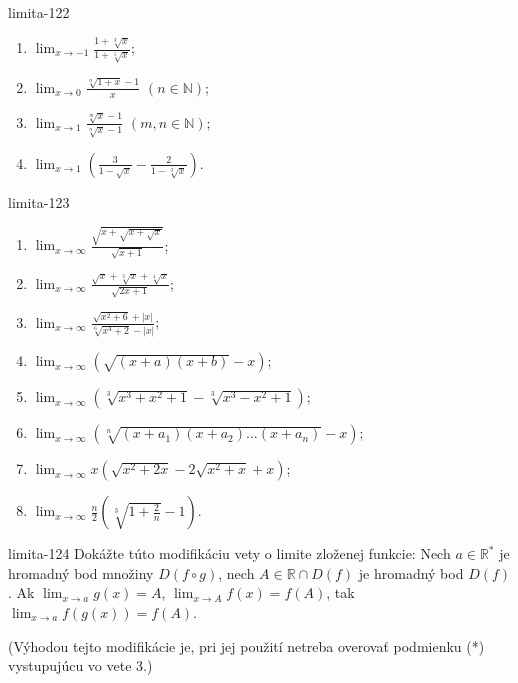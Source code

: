 \begin{defproblem}{limita-122}
\begin{enumerate}
\item $\lim_{x \rightarrow -1} \frac{1+\sqrt[3]{x}}{1+\sqrt[5]{x}}$;
\item $\lim_{x \rightarrow 0} \frac{\sqrt[n]{1+x}-1}{x}$  $(n \in \mathbb{N})$;
\item $\lim_{x \rightarrow 1} \frac{\sqrt[m]{x}-1}{\sqrt[n]{x}-1}$  $(m,n \in \mathbb{N})$;
\item $\lim_{x \rightarrow 1} (\frac{3}{1-\sqrt{x}}-\frac{2}{1-\sqrt[3]{x}})$.
\end{enumerate}
\end{defproblem}

\begin{defproblem}{limita-123}
\begin{multicols}{2}
\begin{enumerate}
    \item $\lim_{{x \rightarrow \infty}} \frac{\sqrt{x+\sqrt{x+\sqrt{x}}}}{\sqrt{x+1}}$;
    \item $\lim_{{x \rightarrow \infty}} \frac{\sqrt{x}+\sqrt[3]{x}+\sqrt[4]{x}}{\sqrt{2x+1}}$;
    \item $\lim_{{x \rightarrow \infty}} \frac{\sqrt{x^2+6}+|x|}{\sqrt[6]{x^4+2}-|x|}$;
    \item $\lim_{{x \rightarrow \infty}} (\sqrt{(x+a)(x+b)}-x)$;
    \item $\lim_{{x \rightarrow \infty}} (\sqrt[3]{x^3+x^2+1}-\sqrt[3]{x^3-x^2+1})$;
    \item $\lim_{{x \rightarrow \infty}} (\sqrt[n]{(x+a_1)(x+a_2)...(x+a_n)}-x)$;
    \item $\lim_{{x \rightarrow \infty}} x(\sqrt{x^2+2x}-2\sqrt{x^2+x}+x)$;
    \item $\lim_{{x \rightarrow \infty}} \frac{n}{2}(\sqrt[3]{1+\frac{2}{n}}-1)$.
\end{enumerate}
\end{multicols}
\end{defproblem}

\begin{defproblem}{limita-124}
Dokážte túto modifikáciu vety o limite zloženej funkcie: Nech $a \in \mathbb{R^*}$ je hromadný bod množiny $D(f \circ g)$, nech $A \in \mathbb{R}\cap D(f)$ je hromadný bod $D(f)$. Ak $\lim_{x \rightarrow a} g(x)=A$, $\lim_{x \rightarrow A} f(x)=f(A)$, tak $\lim_{x \rightarrow a} f(g(x))=f(A)$.

(Výhodou tejto modifikácie je, pri jej použití netreba overovať podmienku (*) vystupujúcu vo vete $3$.)
\end{defproblem}

